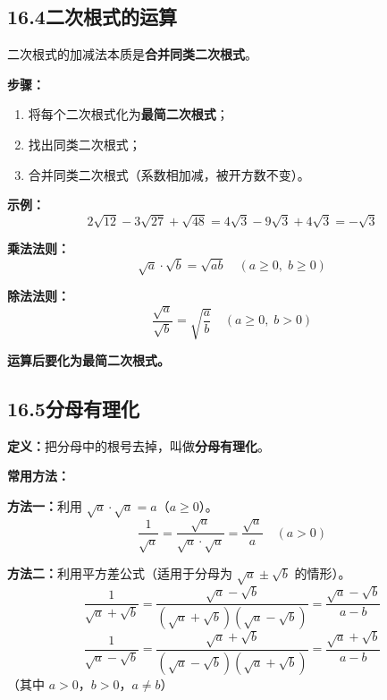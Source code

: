 \documentclass[12pt, a4paper]{ctexart}
\begin{document}
\subsection*{16.4\quad 二次根式的运算}

\begin{knowledgebox}[二次根式的加减法]
二次根式的加减法本质是\textbf{合并同类二次根式}。

\medskip
\textbf{步骤：}
\begin{enumerate}[leftmargin=2em]
  \item 将每个二次根式化为\textbf{最简二次根式}；
  \item 找出同类二次根式；
  \item 合并同类二次根式（系数相加减，被开方数不变）。
\end{enumerate}

\medskip
\textbf{示例：}
\[
2\sqrt{12} - 3\sqrt{27} + \sqrt{48} = 4\sqrt{3} - 9\sqrt{3} + 4\sqrt{3} = -\sqrt{3}
\]
\end{knowledgebox}

\begin{knowledgebox}[二次根式的乘除法]
\textbf{乘法法则：}
\[
\sqrt{a} \cdot \sqrt{b} = \sqrt{ab} \quad (a \geqslant 0,\; b \geqslant 0)
\]

\textbf{除法法则：}
\[
\frac{\sqrt{a}}{\sqrt{b}} = \sqrt{\frac{a}{b}} \quad (a \geqslant 0,\; b > 0)
\]

\medskip
\textbf{运算后要化为最简二次根式。}
\end{knowledgebox}

\subsection*{16.5\quad 分母有理化}

\begin{knowledgebox}[分母有理化]
\textbf{定义：}把分母中的根号去掉，叫做\textbf{分母有理化}。

\medskip
\textbf{常用方法：}

\textbf{方法一：}利用 $\sqrt{a} \cdot \sqrt{a} = a$（$a \geqslant 0$）。
\[
\frac{1}{\sqrt{a}} = \frac{\sqrt{a}}{\sqrt{a} \cdot \sqrt{a}} = \frac{\sqrt{a}}{a} \quad (a > 0)
\]

\textbf{方法二：}利用平方差公式（适用于分母为 $\sqrt{a} \pm \sqrt{b}$ 的情形）。
\[
\frac{1}{\sqrt{a} + \sqrt{b}} = \frac{\sqrt{a} - \sqrt{b}}{(\sqrt{a}+\sqrt{b})(\sqrt{a}-\sqrt{b})} = \frac{\sqrt{a} - \sqrt{b}}{a - b}
\]
\[
\frac{1}{\sqrt{a} - \sqrt{b}} = \frac{\sqrt{a} + \sqrt{b}}{(\sqrt{a}-\sqrt{b})(\sqrt{a}+\sqrt{b})} = \frac{\sqrt{a} + \sqrt{b}}{a - b}
\]
（其中 $a > 0$，$b > 0$，$a \neq b$）
\end{knowledgebox}
\end{document}
